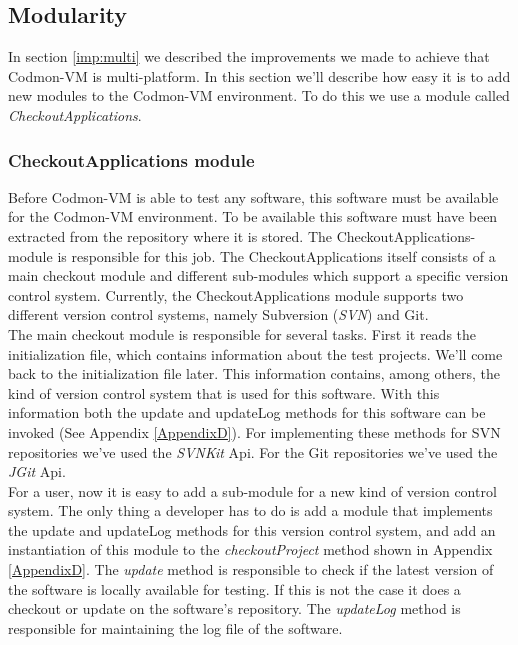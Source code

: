 \documentclass{article}
\newcommand{\project}{Codmon-VM}
\begin{document}
\subsection{Modularity}
\label{imp:modular}
In section \ref{imp:multi} we described the improvements we made to achieve that \project{} is multi-platform. In this section we'll describe how easy it is to add new modules to the \project{} environment. 
To do this we use a module called \emph{CheckoutApplications}.


\subsubsection{CheckoutApplications module}
\label{imp:checkout}
Before \project{} is able to test any software, this software must be available for the \project{} environment. To be available this software must have been extracted from the repository where it is stored. 
The CheckoutApplications-module is responsible for this job. The CheckoutApplications itself consists of a main checkout module and different sub-modules which support a specific version control system. 
Currently, the CheckoutApplications module supports two different version control systems, namely Subversion (\emph{SVN}) and Git.\\

\noindent
The main checkout module is responsible for several tasks. First it reads the initialization file, which contains information about the test projects. We'll come back to the initialization file later. This 
information contains, among others, the kind of version control system that is used for this software. With this information both the update and updateLog methods for this software can be invoked (See 
Appendix \ref{AppendixD}). For implementing these methods for SVN repositories we've used the \emph{SVNKit} Api\cite{SVNKit}. For the Git repositories we've used the \emph{JGit} 
Api\cite{JGit}.\\

\noindent For a user, now it is easy to add a sub-module for a new kind of version control system. The only thing a developer has to do is add a module that implements the update and updateLog methods
for this version control system, and add an instantiation of this module
to the \emph{checkoutProject} method shown in Appendix \ref{AppendixD}. The \emph{update} method is responsible to check if the latest version of the software is locally available for 
testing. If this is not the case it does a checkout or update on the software's repository. The \emph{updateLog} method is responsible for maintaining the log file of the software. 
\end{document}
